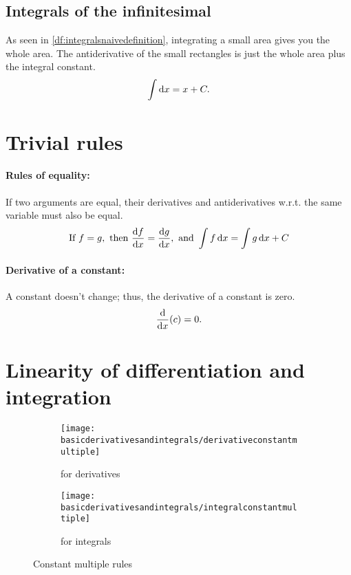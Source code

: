 \subsection{Integrals of the infinitesimal}
As seen in \cref{df:integralsnaivedefinition}, integrating a small area gives you the whole area. The antiderivative of the small rectangles is just the whole area plus the integral constant. 
\begin{equation}
    \int \odif{x} = x + C.
\end{equation}

\section{Trivial rules}
\label{sec:rulesofequality}

\paragraph{Rules of equality:} If two arguments are equal, their derivatives and antiderivatives w.r.t. the same variable must also be equal.
\begin{equation*}
    \textrm{If}~f = g,\textrm{ then }\odv{f}{x} = \odv{g}{x},\textrm{ and }\int f\odif{x} = \int g\odif{x} + C
\end{equation*}

\paragraph{Derivative of a constant:} A constant doesn't change; thus, the derivative of a constant is zero. 
\begin{equation}
    \odv*{(c)}{x} = 0.
\end{equation}

\section{Linearity of differentiation and integration}
\begin{figure}[h]
    \centering
    \begin{subfigure}[t]{0.75\textwidth}
        \centering
        \texttt{[image: basicderivativesandintegrals/derivativeconstantmultiple]}
        \caption{for derivatives}
        \label{fig:derivativesconstantmultiple}
    \end{subfigure}
    \begin{subfigure}[b]{0.36\textwidth}
        \centering
        \texttt{[image: basicderivativesandintegrals/integralconstantmultiple]}
        \caption{for integrals}
        \label{fig:integralsconstantmultiple}
    \end{subfigure}
    \caption{Constant multiple rules}
\end{figure}

